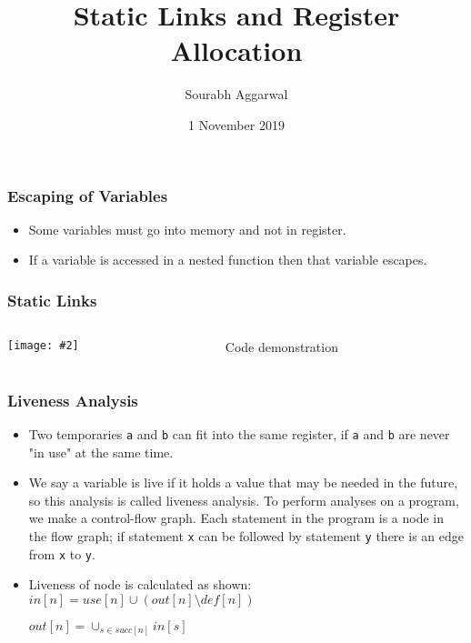 \documentclass{beamer}
\title{Static Links and Register Allocation}
\author{Sourabh Aggarwal}
\institute[IIT Palakkad] %
{
  Department of Computer Science And Engineering\\
  IIT Palakkad
}
\date{1 November 2019}
\newcommand{\iph}[2]{
    \texttt{[image: \#2]}
}
\begin{document}
\begin{frame}
  \titlepage
\end{frame}


\begin{frame}[fragile]
  \frametitle{Escaping of Variables}
  \begin{itemize}

  \item Some variables must go into memory and not in register. 
  \pause
  \item If a variable is accessed in a nested function then that variable escapes.

  \end{itemize}
\end{frame}

\begin{frame}[fragile]
  \frametitle{Static Links}
  \begin{columns}
    \begin{column}{0.5\textwidth}
      \iph{1.15}{sl1}
    \end{column}
    \begin{column}{0.5\textwidth}
      Code demonstration
    \end{column}
    \end{columns}
\end{frame}

\begin{frame}[fragile]
  \frametitle{Liveness Analysis}
  \begin{itemize}
    \item Two temporaries \texttt{a} and \texttt{b} can fit into the same register, if \texttt{a} and \texttt{b} are never "in use" at the same time.
    \item We say a variable is live if it holds a value that may be needed in the future, so this analysis is called liveness analysis. To perform analyses on a program, we make a control-flow graph. Each statement in the program is a node in the flow graph; if statement \texttt{x} can be followed by statement \texttt{y} there is an edge from \texttt{x} to \texttt{y}.
    \item Liveness of node is calculated as shown:
    $in[n] = use[n] \cup (out[n] \setminus def[n])$

    $out[n] = \cup_{s \in succ[n]}in[s]$
  \end{itemize}
\end{frame}
\end{document}
